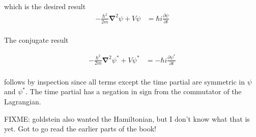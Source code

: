 \documentclass{article}
\newcommand{\LL}[0]{\mathcal{L}}
\newcommand{\PD}[2]{\frac{\partial {#2}}{\partial {#1}}}
\newcommand{\conj}[0]{{*}}
\newcommand{\spacegrad}[0]{\boldsymbol{\nabla}}
\begin{document}
which is the desired result
\begin{align*}
-\frac{\hbar^2}{2 m} \spacegrad^2 \psi + V\psi &= {\hbar i}{} \PD{t}{\psi} \\
\end{align*}

The conjugate result

%
\begin{align*}
-\frac{\hbar^2}{2 m} \spacegrad^2 \psi^\conj + V\psi^\conj &= -{\hbar i}{} \PD{t}{\psi^\conj} \\
\end{align*}

follows by inspection since all terms except the time partial are symmetric in $\psi$ and $\psi^\conj$.  The time partial has a negation in sign from the commutator of the Lagrangian.

FIXME: goldstein also wanted the Hamiltonian, but I don't know what that is yet.  Got to go read the earlier parts of the book!

\end{document}
